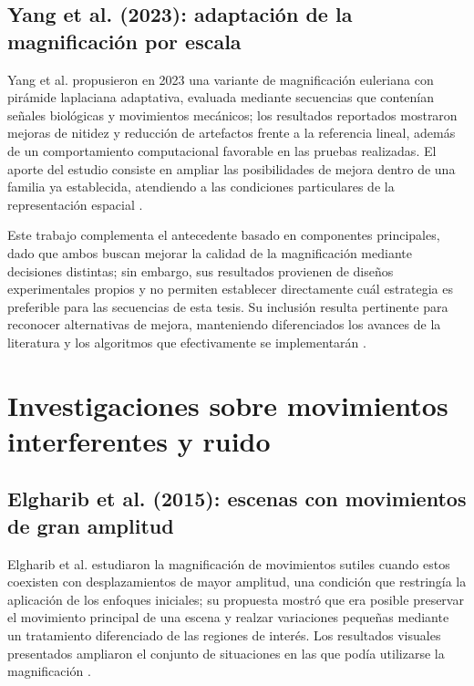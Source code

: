 \subsection{Yang et al. (2023): adaptación de la magnificación por escala}

Yang et al. propusieron en 2023 una variante de magnificación euleriana con pirámide laplaciana adaptativa, evaluada mediante secuencias que contenían señales biológicas y movimientos mecánicos; los resultados reportados mostraron mejoras de nitidez y reducción de artefactos frente a la referencia lineal, además de un comportamiento computacional favorable en las pruebas realizadas. El aporte del estudio consiste en ampliar las posibilidades de mejora dentro de una familia ya establecida, atendiendo a las condiciones particulares de la representación espacial \cite{yang2023adaptive}.

Este trabajo complementa el antecedente basado en componentes principales, dado que ambos buscan mejorar la calidad de la magnificación mediante decisiones distintas; sin embargo, sus resultados provienen de diseños experimentales propios y no permiten establecer directamente cuál estrategia es preferible para las secuencias de esta tesis. Su inclusión resulta pertinente para reconocer alternativas de mejora, manteniendo diferenciados los avances de la literatura y los algoritmos que efectivamente se implementarán \cite{wu2018pca,yang2023adaptive}.

\section{Investigaciones sobre movimientos interferentes y ruido}

\subsection{Elgharib et al. (2015): escenas con movimientos de gran amplitud}

Elgharib et al. estudiaron la magnificación de movimientos sutiles cuando estos coexisten con desplazamientos de mayor amplitud, una condición que restringía la aplicación de los enfoques iniciales; su propuesta mostró que era posible preservar el movimiento principal de una escena y realzar variaciones pequeñas mediante un tratamiento diferenciado de las regiones de interés. Los resultados visuales presentados ampliaron el conjunto de situaciones en las que podía utilizarse la magnificación \cite{elgharib2015video}.

